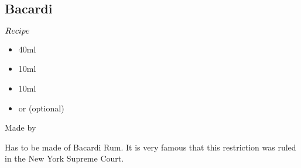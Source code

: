 \subsection{Bacardi}
\begin{itembox}[l]{\boldmath $Recipe$}
\begin{itemize}
\setlength{\parskip}{0cm}
\setlength{\itemsep}{0cm}
\item \bacardi 40ml
\item \limj 10ml
\item \gs 10ml
\item \cherry or \strawberry (optional)
\end{itemize}
\vspace{-4mm}
Made by \shake
\end{itembox}
Has to be made of Bacardi Rum. It is very famous that this restriction was ruled in the New York Supreme Court.
